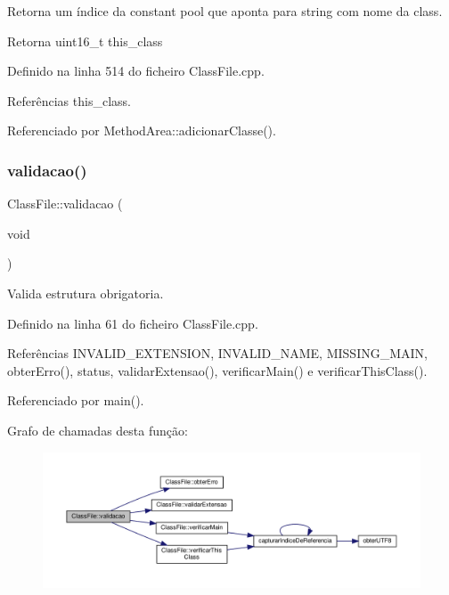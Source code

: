 Retorna um índice da constant pool que aponta para string com nome da class. 

\begin{DoxyReturn}{Retorna}
uint16\+\_\+t this\+\_\+class 
\end{DoxyReturn}


Definido na linha 514 do ficheiro Class\+File.\+cpp.



Referências this\+\_\+class.



Referenciado por Method\+Area\+::adicionar\+Classe().

\mbox{\label{classClassFile_acdb7018a6926b187bc6ecc18abf0fff8}} 
\subsubsection{\texorpdfstring{validacao()}{validacao()}}
{\footnotesize\ttfamily Class\+File\+::validacao (\begin{DoxyParamCaption}\item[{void}]{ }\end{DoxyParamCaption})}



Valida estrutura obrigatoria. 



Definido na linha 61 do ficheiro Class\+File.\+cpp.



Referências I\+N\+V\+A\+L\+I\+D\+\_\+\+E\+X\+T\+E\+N\+S\+I\+ON, I\+N\+V\+A\+L\+I\+D\+\_\+\+N\+A\+ME, M\+I\+S\+S\+I\+N\+G\+\_\+\+M\+A\+IN, obter\+Erro(), status, validar\+Extensao(), verificar\+Main() e verificar\+This\+Class().



Referenciado por main().

Grafo de chamadas desta função\+:
\nopagebreak
\begin{figure}[H]
\begin{center}
\leavevmode
\includegraphics[width=350pt]{classClassFile_acdb7018a6926b187bc6ecc18abf0fff8_cgraph}
\end{center}
\end{figure}
\mbox{\label{classClassFile_a8dd042ff6873b9f0d16f8ee3812261e1}} 
